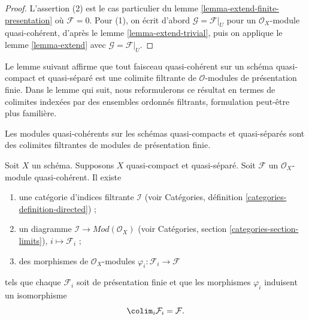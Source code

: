 \begin{proof}
L'assertion (2) est le cas particulier du lemme \ref{lemma-extend-finite-presentation}
où $\mathcal{F} = 0$. Pour (1), on écrit d'abord
$\mathcal{G} = \mathcal{F}|_U$ pour un $\mathcal{O}_X$-module quasi-cohérent,
d'après le lemme \ref{lemma-extend-trivial},
puis on applique le lemme \ref{lemma-extend} avec $\mathcal{G} = \mathcal{F}|_U$.
\end{proof}
\noindent
Le lemme suivant affirme que tout faisceau quasi-cohérent sur un schéma quasi-compact
et quasi-séparé est une colimite filtrante de $\mathcal{O}$-modules
de présentation finie. Dans le lemme qui suit, nous reformulerons ce résultat en termes
de colimites indexées par des ensembles ordonnés filtrants, formulation peut-être plus familière.

\begin{lemma}
\label{lemma-directed-colimit-diagram-finite-presentation}
\begin{slogan}
Les modules quasi-cohérents sur les schémas quasi-compacts et quasi-séparés
sont des colimites filtrantes de modules de présentation finie.
\end{slogan}
Soit $X$ un schéma. Supposons $X$ quasi-compact et quasi-séparé.
Soit $\mathcal{F}$ un $\mathcal{O}_X$-module quasi-cohérent.
Il existe
\begin{enumerate}
\item une catégorie d'indices filtrante $\mathcal{I}$ (voir
Catégories, définition \ref{categories-definition-directed}) ;
\item un diagramme $\mathcal{I} \to \textit{Mod}(\mathcal{O}_X)$ (voir
Catégories, section \ref{categories-section-limits}),
$i \mapsto \mathcal{F}_i$ ;
\item des morphismes de $\mathcal{O}_X$-modules
$\varphi_i : \mathcal{F}_i \to \mathcal{F}$
\end{enumerate}
tels que chaque $\mathcal{F}_i$ soit de présentation finie
et que les morphismes $\varphi_i$ induisent un isomorphisme
$$
\colim_i \mathcal{F}_i
=
\mathcal{F}.
$$
\end{lemma}

